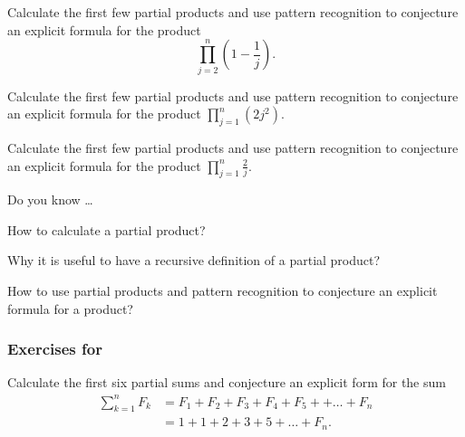 \begin{exer}[\exerU] %
\label{exer_prod_conj_1minus1overj}
    Calculate the first few partial products and use pattern recognition to conjecture an explicit formula for the product 
        $$\displaystyle \prod_{j=2}^n \left(1 - \frac{1}{j}\right).$$ %
\end{exer} 

\begin{exer}[\exerU] %
\label{exer_prod_conj_twice_sq}
    Calculate the first few partial products and use pattern recognition to conjecture an explicit formula for the product   
        $\displaystyle  \prod_{j=1}^n(2j^2).$
\end{exer}

\begin{exer}[\exerU] %
\label{exer_prod_conj_2overj}
    Calculate the first few partial products and use pattern recognition to conjecture an explicit formula for the product  
        $\displaystyle \prod_{j=1}^n \frac{2}{j}.$ %
\end{exer}

\begin{exer}[\exerR] %
\label{exer_dyk_product_conj}
    Do you know \ldots
        \begin{exerpart}
            \item How to calculate a partial product?
            \item Why it is useful to have a recursive definition of a partial product?
            \item How to use partial products and pattern recognition to conjecture an explicit formula for a product? 
        \end{exerpart}
\end{exer}


\subsubsection*{Exercises for  \subsumfib}

\begin{exer} [\exerP] %
\label{exer_sum_firstn_Fib_conj}
    Calculate the first six partial sums and conjecture an explicit form for the sum
        \begin{align*}
            \sum_{k=1}^nF_k
            & = F_1+F_2+F_3+F_4+F_5+ + \ldots +F_n \\
            & =1 + 1 + 2 + 3 + 5 +\ldots + F_n.
        \end{align*}
\end{exer}

